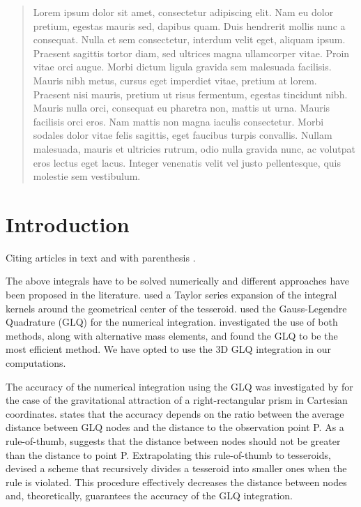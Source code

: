 \begin{abstract}
Lorem ipsum dolor sit amet, consectetur adipiscing elit. Nam eu dolor pretium,
egestas mauris sed, dapibus quam. Duis hendrerit mollis nunc a consequat. Nulla
et sem consectetur, interdum velit eget, aliquam ipsum. Praesent sagittis
tortor diam, sed ultrices magna ullamcorper vitae. Proin vitae orci augue.
Morbi dictum ligula gravida sem malesuada facilisis. Mauris nibh metus, cursus
eget imperdiet vitae, pretium at lorem. Praesent nisi mauris, pretium ut risus
fermentum, egestas tincidunt nibh. Mauris nulla orci, consequat eu pharetra
non, mattis ut urna. Mauris facilisis orci eros. Nam mattis non magna iaculis
consectetur. Morbi sodales dolor vitae felis sagittis, eget faucibus turpis
convallis. Nullam malesuada, mauris et ultricies rutrum, odio nulla gravida
nunc, ac volutpat eros lectus eget lacus. Integer venenatis velit vel justo
pellentesque, quis molestie sem vestibulum.
\end{abstract}

\section{Introduction}

Citing articles in text \citet{Asgharzadeh2007} and with parenthesis
\citep{Braitenberg2011}.

The above integrals
have to be solved numerically
\citep{Wild-Pfeiffer2008}
and different approaches have been proposed in the literature.
\citet{Heck2007}
used a Taylor series expansion
of the integral kernels
around the geometrical center of the tesseroid.
\citet{Asgharzadeh2007}
used the Gauss-Legendre Quadrature (GLQ)
for the numerical integration.
\citet{Wild-Pfeiffer2008} investigated
the use of both methods,
along with alternative mass elements,
and found the GLQ to be the most efficient method.
We have opted to use
the 3D GLQ integration in our computations.

The accuracy of the numerical integration
using the GLQ
was investigated by \citet{Ku1977}
for the case of
the gravitational attraction of
a right-rectangular prism
in Cartesian coordinates.
\citet{Ku1977} states that the accuracy
depends on the ratio between
the average distance between GLQ nodes
and the distance to the observation point P.
As a rule-of-thumb,
\citet{Ku1977} suggests that
the distance between nodes
should not be greater than
the distance to point P.
Extrapolating this rule-of-thumb
to tesseroids,
\citet{Li2011}
devised a scheme that
recursively divides a tesseroid
into smaller ones when the rule is violated.
This procedure
effectively decreases the distance between nodes
and, theoretically, guarantees the accuracy of the GLQ integration.

